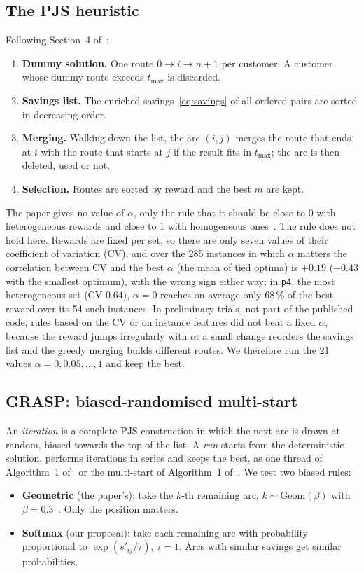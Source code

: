 \documentclass[10pt,a4paper]{article}
\begin{document}
\subsection{The PJS heuristic}

Following Section~4 of~\cite{panadero2021}:
\begin{enumerate}
\item \textbf{Dummy solution.} One route $0\to i\to n+1$ per customer. A customer whose dummy route
exceeds $t_{\max}$ is discarded.
\item \textbf{Savings list.} The enriched savings~\eqref{eq:savings} of all ordered pairs are sorted in
decreasing order.
\item \textbf{Merging.} Walking down the list, the arc $(i,j)$ merges the route that ends at $i$ with the
route that starts at $j$ if the result fits in $t_{\max}$; the arc is then deleted, used or not.
\item \textbf{Selection.} Routes are sorted by reward and the best $m$ are kept.
\end{enumerate}
The paper gives no value of $\alpha$, only the rule that it should be close to 0 with heterogeneous
rewards and close to 1 with homogeneous ones~\cite{panadero2021}. The rule does not hold here. Rewards are fixed per set, so there are
only seven values of their coefficient of variation (CV), and over the 285 instances in which $\alpha$
matters the correlation between CV and the best $\alpha$ (the mean of tied optima) is $+0.19$ ($+0.43$ with the
smallest optimum), with the wrong sign either way; in \texttt{p4}, the most heterogeneous set
(CV $0.64$), $\alpha=0$ reaches on average only $68\,\%$ of the best reward over its 54 such instances. In
preliminary trials, not part of the published code, rules based on the CV or on instance features
did not beat a fixed $\alpha$, because the reward jumps irregularly with $\alpha$: a small change reorders the savings list and the greedy merging
builds different routes. We therefore run the 21 values $\alpha=0,0.05,\dots,1$ and keep the best.

\subsection{GRASP: biased-randomised multi-start}

An \emph{iteration} is a complete PJS construction in which the next arc is drawn at random, biased
towards the top of the list. A \emph{run} starts from the deterministic solution, performs iterations in
series and keeps the best, as one thread of Algorithm~1 of~\cite{panadero2021} or the multi-start of
Algorithm~1 of~\cite{li2022}. We test two biased rules:
\begin{itemize}
\item \textbf{Geometric} (the paper's): take the $k$-th remaining arc, $k\sim\mathrm{Geom}(\beta)$ with
$\beta=0.3$~\cite{panadero2021}. Only the position matters.
\item \textbf{Softmax} (our proposal): take each remaining arc with probability proportional to
$\exp(s'_{ij}/\tau)$, $\tau=1$. Arcs with similar savings get similar probabilities.
\end{itemize}
\end{document}
